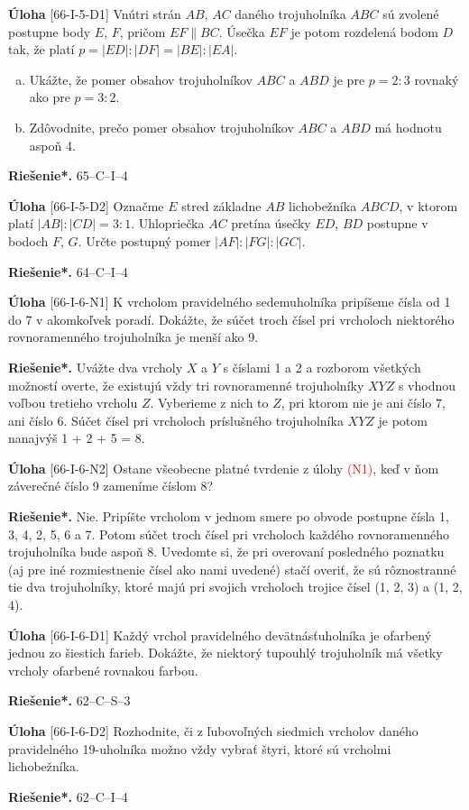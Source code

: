 \documentclass{article}
\newcommand{\rieh}{\textbf{Riešenie*.} }
\newcommand\todo[1]{\noindent\textcolor{red}{(#1)}}
\newcommand{\problem}[3]{
  \begin{tcolorbox}[breakable,notitle,boxrule=0pt,colback=light-gray,colframe=light-gray]
    \textbf{Úloha}
    [#1] #2
  \end{tcolorbox}
  \noindent#3
}
\begin{document}
\problem{66-I-5-D1}{
Vnútri strán $AB$, $AC$ daného trojuholníka $ABC$ sú zvolené postupne body $E$, $F$, pričom $EF \parallel BC$. Úsečka $EF$ je potom rozdelená bodom $D$ tak, že platí $p = |ED|: |DF | = |BE| : |EA|$.
\begin{enumerate}[a)]
    \item Ukážte, že pomer obsahov trojuholníkov $ABC$ a $ABD$ je pre $p = 2 : 3$ rovnaký ako pre $p = 3 : 2$.
    \item Zdôvodnite, prečo pomer obsahov trojuholníkov $ABC$ a $ABD$ má hodnotu aspoň 4.
\end{enumerate}
}{
\rieh 65–C–I–4
}

\problem{66-I-5-D2}{
Označme $E$ stred základne $AB$ lichobežníka $ABCD$, v ktorom platí $|AB| : |CD| = 3 : 1$. Uhlopriečka $AC$ pretína úsečky $ED$, $BD$ postupne v bodoch $F$, $G$. Určte postupný pomer $|AF | : |F G| : |GC|$.
}{
\rieh 64–C–I–4
}


\problem{66-I-6-N1}{
K vrcholom pravidelného sedemuholníka pripíšeme čísla od 1 do 7 v akomkoľvek poradí. Dokážte, že súčet troch čísel pri vrcholoch niektorého rovnoramenného trojuholníka je menší ako 9.
}{
\rieh Uvážte dva vrcholy $X$ a $Y$ s číslami 1 a 2 a rozborom všetkých možností overte, že existujú vždy tri rovnoramenné trojuholníky $XYZ$ s vhodnou voľbou tretieho vrcholu $Z$. Vyberieme z nich to $Z$, pri ktorom nie je ani číslo 7, ani číslo 6. Súčet čísel pri vrcholoch príslušného trojuholníka $XYZ$ je potom nanajvýš 1 + 2 + 5 = 8.
}

\problem{66-I-6-N2}{
Ostane všeobecne platné tvrdenie z úlohy \todo{N1}, keď v ňom záverečné číslo 9 zameníme číslom 8?
}{
\rieh Nie. Pripíšte vrcholom v jednom smere po obvode postupne čísla 1, 3, 4, 2, 5, 6 a 7. Potom súčet troch čísel pri vrcholoch každého rovnoramenného trojuholníka bude aspoň 8. Uvedomte si, že pri overovaní posledného poznatku (aj pre iné rozmiestnenie čísel ako nami uvedené) stačí overiť, že sú rôznostranné tie dva trojuholníky, ktoré majú pri svojich vrcholoch trojice čísel (1, 2, 3) a (1, 2, 4).
}

\problem{66-I-6-D1}{
Každý vrchol pravidelného devätnásťuholníka je ofarbený jednou zo šiestich farieb. Dokážte, že niektorý tupouhlý trojuholník má všetky vrcholy ofarbené rovnakou farbou.
}{
\rieh 62–C–S–3
}

\problem{66-I-6-D2}{
Rozhodnite, či z ľubovoľných siedmich vrcholov daného pravidelného 19-uholníka možno vždy vybrať štyri, ktoré sú vrcholmi lichobežníka.
}{
\rieh 62–C–I–4
}
\end{document}
